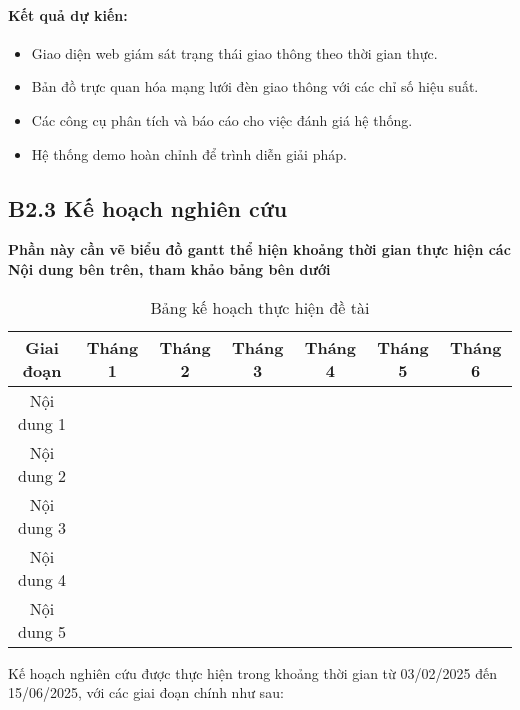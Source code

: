 \documentclass[letterpaper]{article}
\begin{document}
\paragraph{Kết quả dự kiến:}
\begin{itemize}
    \item Giao diện web giám sát trạng thái giao thông theo thời gian thực.
    \item Bản đồ trực quan hóa mạng lưới đèn giao thông với các chỉ số hiệu suất.
    \item Các công cụ phân tích và báo cáo cho việc đánh giá hệ thống.
    \item Hệ thống demo hoàn chỉnh để trình diễn giải pháp.
\end{itemize}

\subsection{B2.3 Kế hoạch nghiên cứu}

\textbf{\color{red}Phần này cần vẽ biểu đồ gantt thể hiện khoảng thời gian thực hiện các Nội dung bên trên, tham khảo bảng bên dưới}

\begin{table}[htbp]
\centering
\begin{tabular}{|c|c|c|c|c|c|c|}
\hline
Giai đoạn & Tháng 1 & Tháng 2 & Tháng 3 & Tháng 4 & Tháng 5 & Tháng 6 \\
\hline
Nội dung 1 & \cellcolor [rgb]{1,0,0}  &  &  & &  & \\
\hline
Nội dung 2 & & \cellcolor [rgb]{1,0.647,0} &  &  &  &  \\
\hline
Nội dung 3 & &  & \cellcolor[rgb]{1,1,0	} & \cellcolor[rgb]{1,1,0} &  &  \\
\hline
Nội dung 4 &  &  &  & \cellcolor[rgb]{0,1,1	} & \cellcolor[rgb]{0,1,1	} & \\
\hline
Nội dung 5 &  &  &  &\cellcolor[rgb]{0,1,0}  &\cellcolor[rgb]{0,1,0}  & \cellcolor[rgb]{0,1,0} \\
\hline
\end{tabular}
\caption{Bảng kế hoạch thực hiện đề tài}
\label{tab:plan}
\end{table}

Kế hoạch nghiên cứu được thực hiện trong khoảng thời gian từ 03/02/2025 đến 15/06/2025, với các giai đoạn chính như sau:
\end{document}
